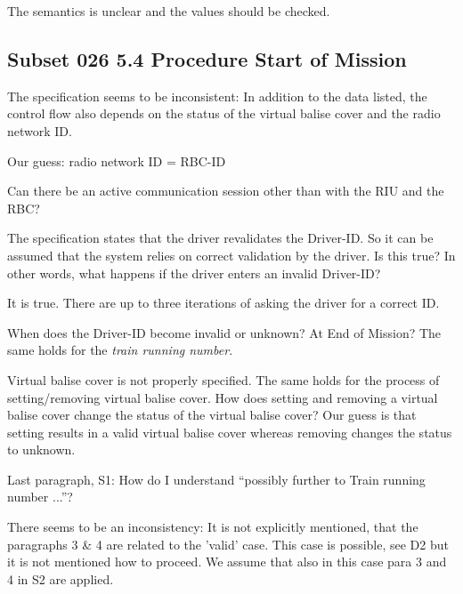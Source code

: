 \documentclass{template/openetcs_article}
\begin{document}
\resolution The semantics is unclear and the values should be checked.


\subsection{Subset 026 5.4 Procedure Start of Mission}

The specification seems to be inconsistent:
In addition to the data listed, the control flow also depends on the status of the virtual balise cover and the radio network ID.

Our guess: radio network ID = RBC-ID


Can there be an active communication session other than with the RIU and the RBC?

The specification states that the driver revalidates the Driver-ID. So it can be assumed that the system relies on correct validation by the driver. Is this true? 
In other words, what happens if the driver enters an invalid Driver-ID?

\resolution It is true. There are up to three iterations of asking the driver for a correct ID.

 When does the Driver-ID become invalid or unknown? At End of Mission? The same holds for the \emph{train running number}.


Virtual balise cover is not properly specified. The same holds for the process of setting/removing virtual balise cover. How does setting and removing a virtual balise cover change the status of the virtual balise cover? Our guess is that setting results in a valid virtual balise cover whereas removing changes the status to unknown.

Last paragraph, S1: How do I understand ``possibly further to Train running number ...''?

There seems to be an inconsistency: It is not explicitly mentioned, that the paragraphs 3 \& 4 are related to the 'valid' case. This case is possible, see D2 but it is not mentioned how to proceed. We assume that also in this case para 3 and 4 in S2 are applied.
\end{document}
